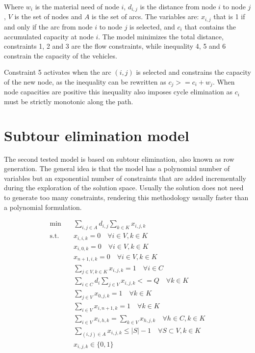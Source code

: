 Where $w_i$ is the material need of node $i$, $d_{i,j}$ is the distance from node $i$ to node $j$, $V$ is the set of nodes and $A$ is the set of arcs. The variables are: $x_{i, j}$ that is 1 if and only if the arc from node $i$ to node $j$ is selected, and $c_i$ that contains the accumulated capacity at node $i$.
The model minimizes the total distance, constraints 1, 2 and 3 are the flow constraints, while inequality 4, 5 and 6 constrain the capacity of the vehicles.

Constraint 5 activates when the arc $(i, j)$ is selected and constrains the capacity of the new node, as the inequality can be rewritten as $c_j >= c_i + w_j$. When node capacities are positive this inequality also imposes cycle elimination as $c_i$ must be strictly monotonic along the path.

\section{Subtour elimination model}
\label{subtour-elimination-model}
The second tested model is based on subtour elimination, also known as row generation. The general idea is that the model has a polynomial number of variables but an exponential number of constraints that are added incrementally during the exploration of the solution space. Usually the solution does not need to generate too many constraints, rendering this methodology usually faster than a polynomial formulation.

\begin{align*}
    \min \quad & \sum_{i,j \in A}{d_{i,j}\sum_{k \in K}{x_{i,j,k}}}\\
    \textrm{s.t.} \quad
      &x_{i,i,k} = 0 \quad \forall i \in V, k \in K \tag{1}\\
      &x_{i, 0, k} = 0 \quad \forall i \in V, k \in K \tag{2}\\
      &x_{n+1, i, k} = 0 \quad \forall i \in V, k \in K \tag{3}\\
      &\sum_{j \in V,k \in K} {x_{i,j,k}} = 1 \quad \forall i \in C \tag{4}\\
      &\sum_{i \in C} {d_i\sum_{j \in V}{x_{i,j,k}}} <= Q \quad \forall k \in K \tag{5}\\
      &\sum_{j \in V} {x_{0,j,k}} = 1 \quad \forall k \in K \tag{6}\\
      &\sum_{i \in V} {x_{i,n+1,k}} = 1 \quad \forall k \in K \tag{7}\\
      &\sum_{i \in V} {x_{i,h,k}} = \sum_{k \in V} {x_{h,j,k}} \quad \forall h \in C, k \in K \tag{8}\\
      &\sum_{(i, j) \in A} {x_{i,j,k}} \leq |S| - 1 \quad \forall S \subset V, k \in K \tag{9} \\
      &x_{i,j,k} \in \{0,1\} \\
\end{align*}

